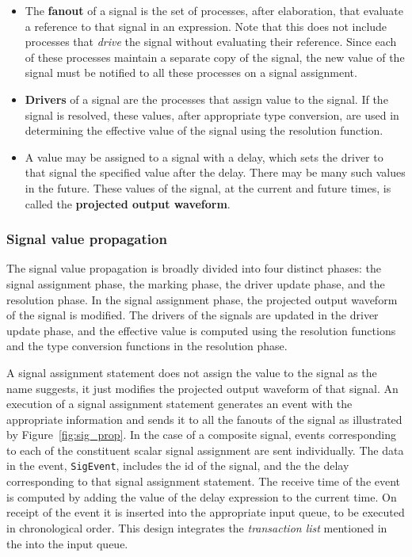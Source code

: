 \documentclass[11pt]{article}
\begin{document}
\begin{itemize}
\item The \textbf{fanout} of a signal is the set of processes, after
  elaboration, that evaluate a reference to that signal in an expression.
  Note that this does not include processes that \textit{drive} the signal
  without evaluating their reference.  Since each of these processes
  maintain a separate copy of the signal, the new value of the signal must
  be notified to all these processes on a signal assignment.
\item \textbf{Drivers} of a signal are the processes that assign value to
  the signal.  If the signal is resolved, these values, after appropriate
  type conversion, are used in determining the effective value of the
  signal using the resolution function.
\item A value may be assigned to a signal with a delay, which sets the
  driver to that signal the specified value after the delay.  There
  may be many such values in the future.  These values of the signal,
  at the current and future times, is called the \textbf{projected
  output waveform}.
\end{itemize}

\subsubsection{Signal value propagation}
\label{sec:signal_value_prop}

The signal value propagation is broadly divided into four distinct
phases: the signal assignment phase, the marking phase, the driver
update phase, and the resolution phase.  In the signal assignment
phase, the projected output waveform of the signal is modified.  The
drivers of the signals are updated in the driver update phase, and the
effective value is computed using the resolution functions and the
type conversion functions in the resolution phase.

A signal assignment statement does not assign the value to the signal as
the name suggests, it just modifies the projected output waveform of that
signal.  An execution of a signal assignment statement generates an event
with the appropriate information and sends it to all the fanouts of the
signal as illustrated by Figure~\ref{fig:sig_prop}.  In the case of a
composite signal, events corresponding to each of the constituent scalar
signal assignment are sent individually.  The data in the event,
\texttt{SigEvent}, includes the id of the signal, and the the delay
corresponding to that signal assignment statement.  The receive time
of the event is computed by adding the value of the delay expression
to the current time.  On receipt of the event it is inserted into the
appropriate input queue, to be executed in chronological order.  This
design integrates the \textit{transaction list} mentioned in the
\LRM\/ into the input queue.
\end{document}
